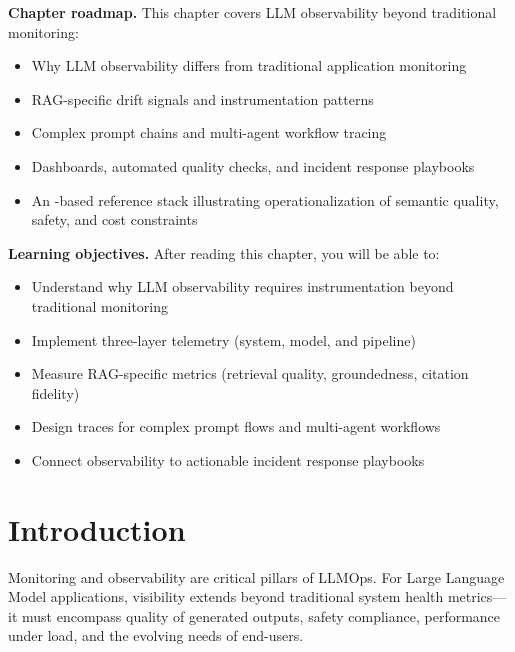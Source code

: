 \begin{tcolorbox}[
  title={\textbf{Chapter Overview}},
  colback=blue!5,
  colframe=blue!40!black,
  colbacktitle=blue!20,
  coltitle=black,
  fonttitle=\bfseries,
  boxrule=0.7pt,
  arc=4pt,
  left=5mm, right=5mm, top=4mm, bottom=4mm
]
\noindent\textbf{Chapter roadmap.}
This chapter covers LLM observability beyond traditional monitoring:
\begin{itemize}[leftmargin=1.5em, itemsep=3pt]
    \item Why LLM observability differs from traditional application monitoring
    \item RAG-specific drift signals and instrumentation patterns
    \item Complex prompt chains and multi-agent workflow tracing
    \item Dashboards, automated quality checks, and incident response playbooks
    \item An \ishtar{}-based reference stack illustrating operationalization of semantic quality, safety, and cost constraints
\end{itemize}

\medskip
\noindent\textbf{Learning objectives.} After reading this chapter, you will be able to:
\begin{itemize}[leftmargin=1.5em, itemsep=3pt]
    \item Understand why LLM observability requires instrumentation beyond traditional monitoring
    \item Implement three-layer telemetry (system, model, and pipeline)
    \item Measure RAG-specific metrics (retrieval quality, groundedness, citation fidelity)
    \item Design traces for complex prompt flows and multi-agent workflows
    \item Connect observability to actionable incident response playbooks
\end{itemize}
\end{tcolorbox}


\section{Introduction}
\label{sec:monitoring-intro}
Monitoring and observability are critical pillars of LLMOps. For Large Language Model applications, visibility extends beyond traditional system health metrics---it must encompass quality of generated outputs, safety compliance, performance under load, and the evolving needs of end-users.

